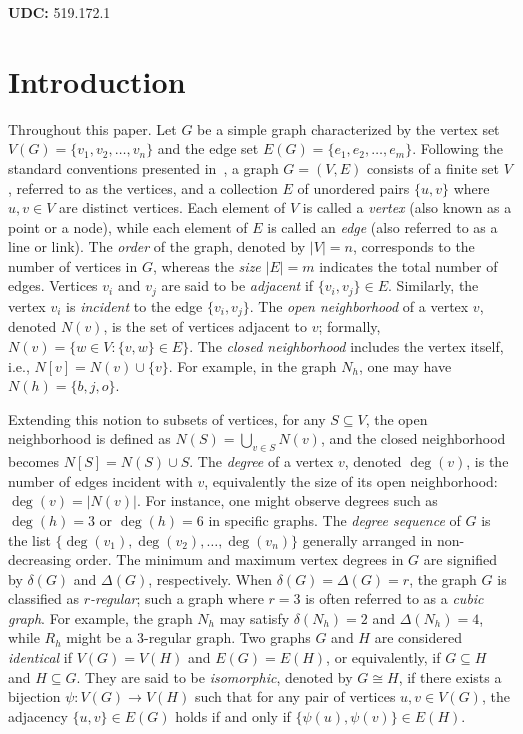 \documentclass{article}
\theoremstyle{definition}
\begin{document}
\noindent\textbf{UDC:} 519.172.1


\section{Introduction}\label{sec1}
Throughout this paper. Let $G$ be a simple graph characterized by the vertex set $V(G) = \{v_1, v_2, \dots, v_n\}$ and the edge set $E(G) = \{e_1, e_2, \dots, e_m\}$. Following the standard conventions presented in~\cite{HaynesHeSLa13}, a graph $G = (V, E)$ consists of a finite set $V$, referred to as the vertices, and a collection $E$ of unordered pairs $\{u, v\}$ where $u, v \in V$ are distinct vertices. Each element of $V$ is called a \emph{vertex} (also known as a point or a node), while each element of $E$ is called an \emph{edge} (also referred to as a line or link). The \emph{order} of the graph, denoted by $|V| = n$, corresponds to the number of vertices in $G$, whereas the \emph{size} $|E| = m$ indicates the total number of edges. Vertices $v_i$ and $v_j$ are said to be \emph{adjacent} if $\{v_i, v_j\} \in E$. Similarly, the vertex $v_i$ is \emph{incident} to the edge $\{v_i, v_j\}$. The \emph{open neighborhood} of a vertex $v$, denoted $N(v)$, is the set of vertices adjacent to $v$; formally, $N(v) = \{w \in V : \{v, w\} \in E\}$. The \emph{closed neighborhood} includes the vertex itself, i.e., $N[v] = N(v) \cup \{v\}$. For example, in the graph $N_h$, one may have $N(h) = \{b, j, o\}$.

Extending this notion to subsets of vertices, for any $S \subseteq V$, the open neighborhood is defined as $N(S) = \bigcup_{v \in S} N(v)$, and the closed neighborhood becomes $N[S] = N(S) \cup S$. The \emph{degree} of a vertex $v$, denoted $\deg(v)$, is the number of edges incident with $v$, equivalently the size of its open neighborhood: $\deg(v) = |N(v)|$. For instance, one might observe degrees such as $\deg(h)=3$ or $\deg(h)=6$ in specific graphs. The \emph{degree sequence} of $G$ is the list $\{\deg(v_1), \deg(v_2), \dots, \deg(v_n)\}$ generally arranged in non-decreasing order. The minimum and maximum vertex degrees in $G$ are signified by $\delta(G)$ and $\Delta(G)$, respectively. When $\delta(G) = \Delta(G) = r$, the graph $G$ is classified as \emph{$r$-regular}; such a graph where $r=3$ is often referred to as a \emph{cubic graph}. For example, the graph $N_h$ may satisfy $\delta(N_h) = 2$ and $\Delta(N_h) = 4$, while $R_h$ might be a 3-regular graph. Two graphs $G$ and $H$ are considered \emph{identical} if $V(G) = V(H)$ and $E(G) = E(H)$, or equivalently, if $G \subseteq H$ and $H \subseteq G$. They are said to be \emph{isomorphic}, denoted by $G \cong H$, if there exists a bijection $\psi : V(G) \to V(H)$ such that for any pair of vertices $u,v \in V(G)$, the adjacency $\{u, v\} \in E(G)$ holds if and only if $\{\psi(u), \psi(v)\} \in E(H)$.
\end{document}

